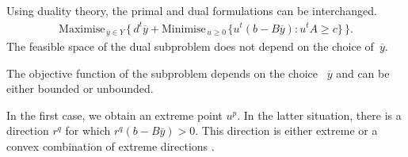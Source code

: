 \newpage
\subsection*{}


Using duality theory, the primal and dual formulations can be interchanged.
\begin{eqnarray*}
\label{bd4}  \textrm{Maximise}_{\, \overline{y} \in Y \,} \{\,
d^t\overline{y} + \textrm{Minimise}_{\, u\geq 0 \,} \{ u^t(b-B\overline{y})
: u^tA \geq c\}\, \}.
\end{eqnarray*}
The feasible space of the dual subproblem does not depend on the choice of~$\overline{y}$.

\vfill

 The objective function of the subproblem depends on the choice ~$\overline{y}$ and can be either bounded or unbounded. 


\begin{center}
\end{center}

\vfill


In the first case, we obtain an extreme point $u^p$. In the latter situation, there is a direction $r^q$ for which $r^q(b-B\overline{y}) > 0$.  This direction is either extreme or a convex combination of extreme directions \cite{costa09benders}. 
\vfill


\newpage
\subsection*{}

